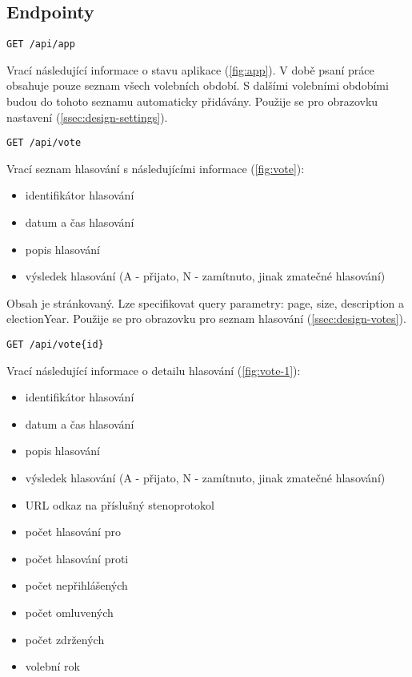 \subsection*{Endpointy}

\begin{lstlisting}[label={lst:endpoint-app}] 
GET /api/app
\end{lstlisting}

\noindent Vrací následující informace o stavu aplikace (\ref{fig:app}). V době psaní práce obsahuje pouze seznam všech volebních období. S dalšími volebními obdobími budou do tohoto seznamu automaticky přidávány. Použije se pro obrazovku nastavení (\ref{ssec:design-settings}).

\vspace{10px}

\begin{lstlisting}[label={lst:endpoint-votes}] 
GET /api/vote
\end{lstlisting}

\noindent Vrací seznam hlasování s následujícími informace (\ref{fig:vote}):
\begin{itemize}
	\item identifikátor hlasování
	\item datum a čas hlasování
	\item popis hlasování
	\item výsledek hlasování (A - přijato, N - zamítnuto, jinak zmatečné hlasování)
\end{itemize}

\noindent Obsah je stránkovaný. Lze specifikovat query parametry: page, size, description a electionYear. Použije se pro obrazovku pro seznam hlasování (\ref{ssec:design-votes}).

\vspace{10px}

\begin{lstlisting}[label={lst:endpoint-vote}] 
GET /api/vote{id}
\end{lstlisting}

\noindent Vrací následující informace o detailu hlasování (\ref{fig:vote-1}):
\begin{itemize}
	\item identifikátor hlasování
	\item datum a čas hlasování
	\item popis hlasování
	\item výsledek hlasování (A - přijato, N - zamítnuto, jinak zmatečné hlasování)
	\item URL odkaz na příslušný stenoprotokol
	\item počet hlasování pro
	\item počet hlasování proti
	\item počet nepřihlášených
	\item počet omluvených
	\item počet zdržených
	\item volební rok
\end{itemize}

